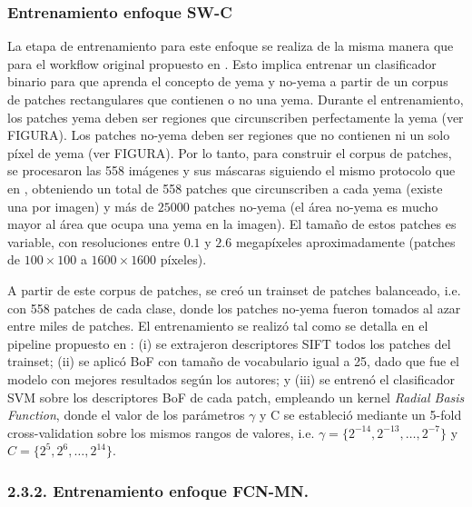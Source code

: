 \documentclass[a4paper,authoryear,review]{elsarticle}
\begin{document}
\subsubsection{Entrenamiento enfoque SW-C} 
\label{swtrain}

La etapa de entrenamiento para este enfoque se realiza de la misma manera que para el workflow original propuesto en \citet{perez2017image}. Esto implica entrenar un clasificador binario para que aprenda el concepto de yema y no-yema a partir de un corpus de patches rectangulares que contienen o no una yema. Durante el entrenamiento, los patches yema deben ser regiones que circunscriben perfectamente la yema (ver FIGURA). Los patches no-yema deben ser regiones que no contienen ni un solo píxel de yema (ver FIGURA). Por lo tanto, para construir el corpus de patches, se procesaron las 558 imágenes y sus máscaras siguiendo el mismo protocolo que en \citet{perez2017image}, obteniendo un total de 558 patches que circunscriben a cada yema (existe una por imagen) y más de $25000$ patches no-yema (el área no-yema es mucho mayor al área que ocupa una yema en la imagen). El tamaño de estos patches es variable, con resoluciones entre $0.1$ y $2.6$ megapíxeles aproximadamente (patches de $100 \times 100$ a $1600 \times 1600$ píxeles).

A partir de este corpus de patches, se creó un trainset de patches balanceado, i.e. con 558 patches de cada clase, donde los patches no-yema fueron tomados al azar entre miles de patches. El entrenamiento se realizó tal como se detalla en el pipeline propuesto en \citet{perez2017image}: (i) se extrajeron descriptores SIFT todos los patches del trainset; (ii) se aplicó BoF con tamaño de vocabulario igual a 25, dado que fue el modelo con mejores resultados según los autores; y (iii) se entrenó el clasificador SVM sobre los descriptores BoF de cada patch, empleando un kernel \emph{Radial Basis Function}, donde el valor de los parámetros $\gamma$ y C se estableció mediante un 5-fold cross-validation sobre los mismos rangos de valores, i.e. $\gamma = \{2^{-14}, 2^{-13}, … , 2^{-7}\}$ y $C = \{2^{5}, 2^{6}, … , 2^{14}\}$.

\subsubsection{2.3.2. Entrenamiento enfoque FCN-MN.} \label{fcntrain}
\end{document}
